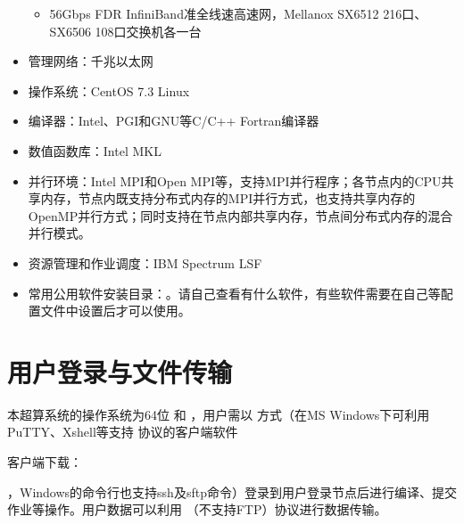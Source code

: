 \documentclass[a4paper,12pt,english]{sphinxmanual}
\begin{document}
\begin{itemize}
\begin{itemize}
\item {} 
\sphinxAtStartPar
56Gbps FDR InfiniBand准全线速高速网，Mellanox SX6512 216口、SX6506
108口交换机各一台

\end{itemize}

\item {} 
\sphinxAtStartPar
管理网络：千兆以太网

\item {} 
\sphinxAtStartPar
操作系统：CentOS 7.3 Linux

\item {} 
\sphinxAtStartPar
编译器：Intel、PGI和GNU等C/C++ Fortran编译器

\item {} 
\sphinxAtStartPar
数值函数库：Intel MKL

\item {} 
\sphinxAtStartPar
并行环境：Intel MPI和Open
MPI等，支持MPI并行程序；各节点内的CPU共享内存，节点内既支持分布式内存的MPI并行方式，也支持共享内存的OpenMP并行方式；同时支持在节点内部共享内存，节点间分布式内存的混合并行模式。

\item {} 
\sphinxAtStartPar
资源管理和作业调度：IBM Spectrum LSF

\item {} 
\sphinxAtStartPar
常用公用软件安装目录：。请自己查看有什么软件，有些软件需要在自己等配置文件中设置后才可以使用。

\end{itemize}

\begin{figure}[htbp]
\centering

\noindent{}
\end{figure}

\sphinxstepscope


\chapter{用户登录与文件传输}
\label{\detokenize{login-ftp/login-ftp:id1}}\label{\detokenize{login-ftp/login-ftp::doc}}
\sphinxAtStartPar
本超算系统的操作系统为64位  和  ，用户需以  方式（在MS Windows下可利用PuTTY、Xshell等支持  协议的客户端软件 %
\begin{footnote}[1]\sphinxAtStartFootnote
客户端下载：
%
\end{footnote}，Windows的命令行也支持ssh及sftp命令）登录到用户登录节点后进行编译、提交作业等操作。用户数据可以利用  （不支持FTP）协议进行数据传输。
\end{document}

